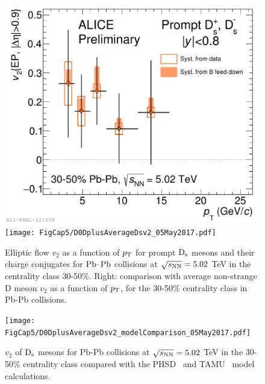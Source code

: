 \begin{figure}[!t]
\begin{center}
\includegraphics[width=.49\textwidth]{FigCap5/Dsv2_3050.pdf}
\texttt{[image: FigCap5/D0DplusAverageDsv2\_05May2017.pdf]}
\caption{Elliptic flow $v_2$ as a function of $p_{\rm T}$ for prompt ${\rm D_s}$ mesons 
and their charge conjugates for $\mbox{Pb--Pb}$ collisions at $\sqrt{s_{\rm NN}} = 5.02$ TeV in the centrality class 30-50\%.
Right: comparison with average non-strange D meson $v_2$ as a function 
of $p_{\rm T}$, for the 30-50\% centrality class in Pb-Pb collisions. }
\label{fig:v2_Ds} 
\end{center}
\end{figure}

\begin{figure}[!t]
\begin{center}
\texttt{[image: FigCap5/D0DplusAverageDsv2\_modelComparison\_05May2017.pdf]}
\caption{$v_2$ of ${\rm D_s}$ mesons for Pb-Pb collisions at $\sqrt{s_{\rm NN}} = 5.02$ TeV in the 30-50\% centrality class compared with the PHSD~\cite{Song:2015ykw}  and TAMU~\cite{He:2014cla} model calculations.}
\label{fig:v2_models} 
\end{center}
\end{figure}

